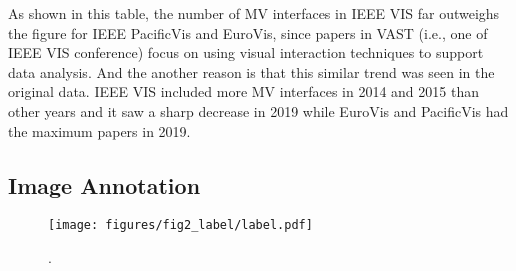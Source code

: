As shown in this table, the number of MV interfaces in IEEE VIS far outweighs the figure for IEEE PacificVis and EuroVis, since papers in VAST (i.e., one of IEEE VIS conference) focus on using visual interaction techniques to support data analysis. 
And the another reason is that this similar trend was seen in the original data.
IEEE VIS included more MV interfaces in 2014 and 2015 than other years and it saw a sharp decrease in 2019 while EuroVis and PacificVis had the maximum papers in 2019.


\subsection{Image Annotation}
\label{ssec:label_tool}


\begin{figure}[t]
  \centering
  \texttt{[image: figures/fig2\_label/label.pdf]}
  \caption{.}
  \label{fig:vis_process}
  \vspace*{-3mm}
\end{figure}

